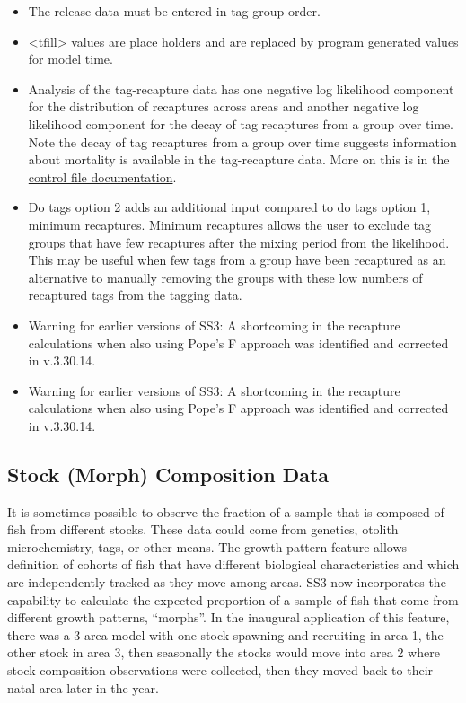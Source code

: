 	\begin{itemize}
		\item The release data must be entered in tag group order.
		\item <tfill> values are place holders and are replaced by program generated values for model time.
		\item Analysis of the tag-recapture data has one negative log likelihood component for the distribution of recaptures across areas and another negative log likelihood component for the decay of tag recaptures from a group over time. Note the decay of tag recaptures from a group over time suggests information about mortality is available in the tag-recapture data. More on this is in the \hyperlink{tagrecapture}{control file documentation}.
		\item  Do tags option 2 adds an additional input compared to do tags option 1, minimum recaptures. Minimum recaptures allows the user to exclude tag groups that have few recaptures after the mixing period from the likelihood. This may be useful when few tags from a group have been recaptured as an alternative to manually removing the groups with these low numbers of recaptured tags from the tagging data.
		\item Warning for earlier versions of SS3: A shortcoming in the recapture calculations when also using Pope's F approach was identified and corrected in v.3.30.14.
		\item Warning for earlier versions of SS3: A shortcoming in the recapture calculations when also using Pope's F approach was identified and corrected in v.3.30.14.
	\end{itemize}

\subsection{Stock (Morph) Composition Data}
It is sometimes possible to observe the fraction of a sample that is composed of fish from different stocks. These data could come from genetics, otolith microchemistry, tags, or other means. The growth pattern feature allows definition of cohorts of fish that have different biological characteristics and which are independently tracked as they move among areas. SS3 now incorporates the capability to calculate the expected proportion of a sample of fish that come from different growth patterns, ``morphs''. In the inaugural application of this feature, there was a 3 area model with one stock spawning and recruiting in area 1, the other stock in area 3, then seasonally the stocks would move into area 2 where stock composition observations were collected, then they moved back to their natal area later in the year.

